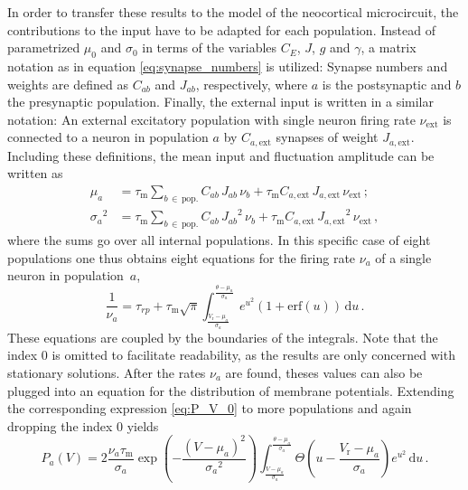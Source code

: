 In order to transfer these results to the model of the neocortical microcircuit, 
the contributions to the input have to be adapted for each population. Instead of 
parametrized $\mu_0$ and $\sigma_0$ in terms of the variables $C_E$, $J$, $g$ and $\gamma$, 
a matrix notation as in equation \eqref{eq:synapse_numbers} is utilized: 
Synapse numbers and weights are defined as $C_{ab}$ and $J_{ab}$, respectively, 
where $a$ is the postsynaptic and $b$ the presynaptic population. 
Finally, the external input is written in a similar notation: 
An external excitatory population with single neuron firing rate $\nu_\text{ext}$ 
is connected to a neuron in population $a$ by 
$C_{a, \text{ext}}$ synapses of weight $J_{a, \text{ext}}$.
Including these definitions, the mean input and fluctuation amplitude can 
be written as 
\begin{align}
    \mu_a        &= 
        \tau_\text{m} \sum_{b \,\in \,\text{pop.}} C_{ab} \, J_{ab} \, \nu_b 
        + \tau_\text{m} C_{a, \text{ext}} \, J_{a, \text{ext}} \, \nu_\text{ext} \, ; \\
    {\sigma_a}^2 &= 
        \tau_\text{m} \sum_{b \,\in \,\text{pop.}} C_{ab} \, {J_{ab}}^2  \, \nu_b
        + \tau_\text{m} C_{a, \text{ext}} \,{J_{a, \text{ext}}}^2 \,\nu_\text{ext}\,,
\end{align}
where the sums go over all internal populations. In this specific case of eight 
populations one thus obtains eight equations for the 
firing rate $\nu_a$ of a single neuron in population~$a$, 
\begin{equation}
    \frac{1}{\nu_{a}} = \tau_{rp} 
        + \tau_\text{m} \sqrt{\pi}
            \int_{\frac{V_\text{r} - \mu_{a}}{\sigma_{a}}}^{\frac{\theta - \mu_{a}}{\sigma_{a}}} 
                e^{u^2} \left(1 + \text{erf}(u)\right) \,\text{d}u  \,.
    \label{eq:self_consistency_a}
\end{equation}
These equations are coupled by the boundaries of the integrals. Note that the index $0$ 
is omitted to facilitate readability, as the results are only concerned with stationary
solutions. After the rates $\nu_a$ are found, theses values can also be 
plugged into an equation for the distribution of membrane potentials. Extending the 
corresponding expression \eqref{eq:P_V_0} to more populations and again dropping the 
index $0$ yields
\begin{equation}
    P_a(V) = 2 \frac{\nu_a \tau_\text{m}}{\sigma_a} 
        \exp{\left(- \frac{(V - \mu_a)^2}{{\sigma_a}^2} \right)}
        \int_{\frac{V - \mu_a}{\sigma_a}}^{\frac{\theta - \mu_a}{\sigma_a}} \! 
            \Theta \left(u - \frac{V_\text{r} - \mu_a}{\sigma_a} \right) e^{u^2} \, \text{d}u  \,.
    \label{eq:P_V_a}
\end{equation}
